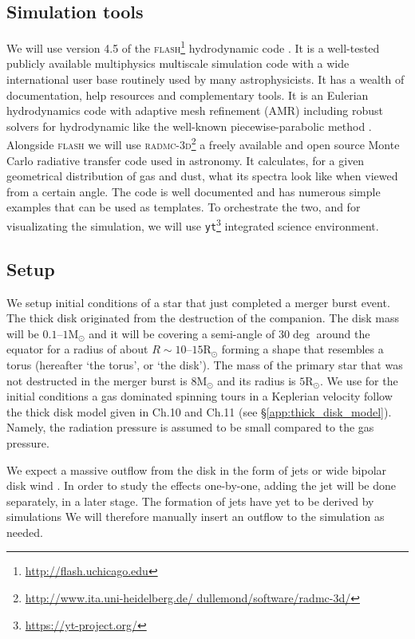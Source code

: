 \documentclass[modern]{aastex62}
\newcommand{\Rsun}{\mathrm{R}_\odot}
\newcommand{\Msun}{\mathrm{M}_\odot}
\newcommand{\flash}[1]{\textsc{flash}#1}
\newcommand{\radmc}[1]{\textsc{radmc-3d}#1}
\newcommand{\yt}[1]{\texttt{yt}#1}
\begin{document}
\subsection{Simulation tools}
We will use version 4.5 of the \flash{}\footnote{\url{http://flash.uchicago.edu}} hydrodynamic code \citep{2000ApJS..131..273F}. It is a well-tested publicly available multiphysics multiscale simulation code with a wide international user base routinely used by many astrophysicists. It has a wealth of documentation, help resources and complementary tools. It is an Eulerian hydrodynamics code with adaptive mesh refinement (AMR) including robust solvers for hydrodynamic like the well-known piecewise-parabolic method \citep[PPM; ][]{1984JCoPh..54..174C}. Alongside \flash{} we will use \radmc\footnote{\url{http://www.ita.uni-heidelberg.de/ dullemond/software/radmc-3d/}} \citep{2012ascl.soft02015D} a freely available and open source Monte Carlo radiative transfer code used in astronomy.%
It calculates, for a given geometrical distribution of gas and dust, what its spectra look like when viewed from a certain angle. The code is well documented and has numerous simple examples that can be used as templates. To orchestrate the two, and for visualizating the simulation, we will use \yt{}\footnote{\url{https://yt-project.org/}} \citep{2011ApJS..192....9T} integrated science environment.

\subsection{Setup}
\label{sec:setup}
We setup initial conditions of a star that just completed a merger burst event.
The thick disk originated from the destruction of the companion.
The disk mass will be $0.1$--$1 \Msun$ and it will be covering a semi-angle of $30 \deg$ around the equator for a radius of about $R\sim10$--$15 \Rsun$ forming a shape that resembles a torus (hereafter `the torus', or `the disk').
The mass of the primary star that was not destructed in the merger burst is $8 \Msun$ and its radius is $5 \Rsun$.
We use for the initial conditions a gas dominated spinning tours in a Keplerian velocity follow the thick disk model given in \cite{2002apa..book.....F} Ch.10 and Ch.11 (see \S\ref{app:thick_disk_model}). Namely, the radiation pressure is assumed to be small compared to the gas pressure.


We expect a massive outflow from the disk in the form of jets or wide bipolar disk wind \citep[see][]{2018ApJ...868..136M,2019arXiv190203931S}.
In order to study the effects one-by-one, adding the jet will be done separately, in a later stage.
The formation of jets have yet to be derived by simulations
We will therefore manually insert an outflow to the simulation as needed.
\end{document}
